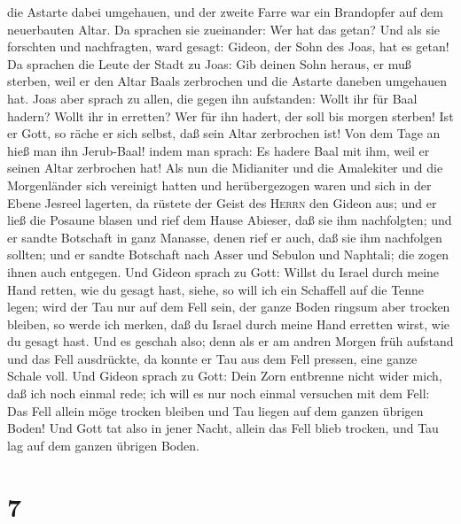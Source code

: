 die Astarte dabei umgehauen, und der zweite Farre war ein Brandopfer auf
dem neuerbauten Altar.  Da sprachen sie zueinander: Wer
hat das getan? Und als sie forschten und nachfragten, ward gesagt:
Gideon, der Sohn des Joas, hat es getan!  Da sprachen die
Leute der Stadt zu Joas: Gib deinen Sohn heraus, er muß sterben, weil er
den Altar Baals zerbrochen und die Astarte daneben umgehauen hat.
 Joas aber sprach zu allen, die gegen ihn aufstanden:
Wollt ihr für Baal hadern? Wollt ihr in erretten? Wer für ihn hadert,
der soll bis morgen sterben! Ist er Gott, so räche er sich selbst, daß
sein Altar zerbrochen ist!  Von dem Tage an hieß man ihn
Jerub-Baal! indem man sprach: Es hadere Baal mit ihm, weil er seinen
Altar zerbrochen hat!  Als nun die Midianiter und die
Amalekiter und die Morgenländer sich vereinigt hatten und herübergezogen
waren und sich in der Ebene Jesreel lagerten,  da rüstete
der Geist des \textsc{Herrn} den Gideon aus; und er ließ die Posaune
blasen und rief dem Hause Abieser, daß sie ihm nachfolgten;
 und er sandte Botschaft in ganz Manasse, denen rief er
auch, daß sie ihm nachfolgen sollten; und er sandte Botschaft nach Asser
und Sebulon und Naphtali; die zogen ihnen auch entgegen. 
Und Gideon sprach zu Gott: Willst du Israel durch meine Hand retten, wie
du gesagt hast,  siehe, so will ich ein Schaffell auf die
Tenne legen; wird der Tau nur auf dem Fell sein, der ganze Boden ringsum
aber trocken bleiben, so werde ich merken, daß du Israel durch meine
Hand erretten wirst, wie du gesagt hast.  Und es geschah
also; denn als er am andren Morgen früh aufstand und das Fell
ausdrückte, da konnte er Tau aus dem Fell pressen, eine ganze Schale
voll.  Und Gideon sprach zu Gott: Dein Zorn entbrenne
nicht wider mich, daß ich noch einmal rede; ich will es nur noch einmal
versuchen mit dem Fell: Das Fell allein möge trocken bleiben und Tau
liegen auf dem ganzen übrigen Boden!  Und Gott tat also
in jener Nacht, allein das Fell blieb trocken, und Tau lag auf dem
ganzen übrigen Boden.

\hypertarget{section-6}{%
\section{7}\label{section-6}}

